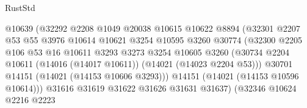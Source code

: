 \begin{lexlean}{RustStd}
\begin{coremodule}
                                        @10639
                                        (@32292
                                          @2208
                                          @1049
                                          @20038
                                          @10615
                                          @10622
                                          @8894
                                          (@32301
                                            @2207
                                            @53
                                            @55
                                            @3976
                                            @10614
                                            @10621
                                            @3254
                                            @10595
                                            @3260
                                            @30774
                                            (@32300
                                              @2205
                                              @106
                                              @53
                                              @16
                                              @10611
                                              @3293
                                              @3273
                                              @3254
                                              @10605
                                              @3260
                                              (@30734
                                                @2204
                                                @10611
                                                (@14016 (@14017 @10611))
                                                (@14021 (@14023 @2204 @53)))
                                              @30701
                                              @14151
                                              (@14021 (@14153 @10606 @3293)))
                                            @14151
                                            (@14021 (@14153 @10596 @10614)))
                                          @31616
                                          @31619
                                          @31622
                                          @31626
                                          @31631
                                          @31637)
                                        (@32346
                                          @10624
                                          @2216
                                          @2223

\end{coremodule}
\end{lexlean}
